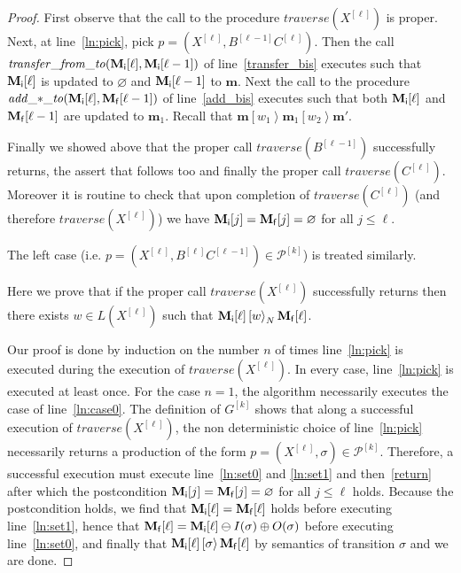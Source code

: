 \documentclass{fsttcs}
\def\mmap{\mathbf{m}}
\newcommand{\fire}[1]{\left[ {#1}\right\rangle}
\def\prod{\mathcal{P}}
\begin{document}
\begin{proof}
First observe that the call to the procedure \(\mathit{traverse}(X^{[\ell]})\) is proper.
Next, at line~\ref{ln:pick}, pick \(p=(X^{[\ell]},B^{[\ell-1]}C^{[\ell]})\).
Then the call \(\mathit{transfer\_from\_to}(\mathbf{M_{\sf i}}[\ell],\mathbf{M_{\sf i}}[\ell-1])\) of line~\ref{transfer_bis} executes
such that \(\mathbf{M_{\sf i}}[\ell]\) is updated to \(\varnothing\) and \(\mathbf{M_{\sf i}}[\ell-1]\) to \(\mmap\).
Next the call to the procedure \(\mathit{add\_\mathord{\ast}\_to}(\mathbf{M_{\sf i}}[\ell],\mathbf{M_{\sf f}}[\ell-1])\) of line~\ref{add_bis} executes such that
both \(\mathbf{M_{\sf i}}[\ell]\) and \(\mathbf{M_{\sf f}}[\ell-1]\) are updated to \(\mmap_1\). Recall that \(\mmap\fire{w_1}\mmap_1\fire{w_2}\mmap'\).

Finally we showed above that the proper call \(\mathit{traverse}(B^{[\ell-1]})\) successfully returns, the assert that follows too and
finally the proper call \(\mathit{traverse}(C^{[\ell]})\). Moreover it is routine to check that 
upon completion of \(\mathit{traverse}(C^{[\ell]})\) (and therefore
\(\mathit{traverse}(X^{[\ell]})\)) we have \(\mathbf{M_{\sf
i}}[j]=\mathbf{M_{\sf f}}[j]=\varnothing\) for all \(j\leq \ell\).

The left case (i.e. \(p=(X^{[\ell]},B^{[\ell]}C^{[\ell-1]})\in\prod^{[k]}\)) is treated similarly.

Here we prove that if the proper call \(\mathit{traverse}(X^{[\ell]})\) successfully returns then
there exists \(w\in L(X^{[\ell]})\) such that \(\mathbf{M_{\sf i}}[\ell]\fire{w}_N\mathbf{M_{\sf f}}[\ell]\).

Our proof is done by induction on the number \(n\) of times line~\ref{ln:pick}
is executed during the execution of \(\mathit{traverse}(X^{[\ell]})\). 
In every case, line~\ref{ln:pick} is executed at least once.  
For the case \(n=1\), the algorithm necessarily executes the case of line~\ref{ln:case0}.
The definition of \(G^{[k]}\) shows that along a successful execution of
\(\mathit{traverse}(X^{[\ell]})\), the non deterministic choice of
line~\ref{ln:pick} necessarily returns a production of the form \(
p=(X^{[\ell]},\sigma)\in\prod^{[k]}\). Therefore, a successful execution must
execute line~\ref{ln:set0} and \ref{ln:set1} and then~\ref{return} after
which the postcondition \(\mathbf{M_{\sf i}}[j]=\mathbf{M_{\sf
f}}[j]=\varnothing\) for all \(j\leq \ell\) holds.  Because the postcondition
holds, we find that \(\mathbf{M_{\sf i}}[\ell]=\mathbf{M_{\sf f}}[\ell]\) holds
before executing line~\ref{ln:set1}, hence that \(\mathbf{M_{\sf
f}}[\ell]=\mathbf{M_{\sf i}}[\ell]\ominus I(\sigma)\oplus O(\sigma)\) before
executing line~\ref{ln:set0}, and finally that \(\mathbf{M_{\sf
i}}[\ell]\fire{\sigma}\mathbf{M_{\sf f}}[\ell]\) by semantics of transition \(\sigma\) and we are done.


\end{proof}
\end{document}
